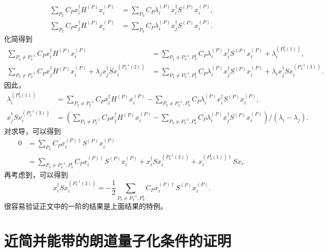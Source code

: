 \begin{align}
\sum_{P_{2}}C_{P}x_{i}^{\dagger}H^{(P)}x_{i}^{(P)} & =\sum_{P_{3}}C_{P}\lambda_{i}^{(P)}x_{i}^{\dagger}S^{(P)}x_{i}^{(P)},\\
\sum_{P_{2}}C_{P}x_{j}^{\dagger}H^{(P)}x_{i}^{(P)} & =\sum_{P_{3}}C_{P}\lambda_{i}^{(P)}x_{j}^{\dagger}S^{(P)}x_{i}^{(P)}.
\end{align}
化简得到
\begin{align}
\sum_{P_{2}\ne P_{2}^{-1}}C_{P}x_{i}^{\dagger}H^{(P)}x_{i}^{(P)} & =\sum_{P_{3}\ne P_{3}^{-1},P_{3}^{1}}C_{P}\lambda_{i}^{(P)}x_{i}^{\dagger}S^{(P)}x_{i}^{(P)}+\lambda_{i}^{(P_{3}^{1}(1))},\\
\sum_{P_{2}\ne P_{2}^{-1}}C_{P}x_{j}^{\dagger}H^{(P)}x_{i}^{(P)}+\lambda_{j}x_{j}^{\dagger}Sx_{i}^{(P_{2}^{-1}(2))} & =\sum_{P_{3}\ne P_{3}^{-1},P_{3}^{1}}C_{P}\lambda_{i}^{(P)}x_{j}^{\dagger}S^{(P)}x_{i}^{(P)}+\lambda_{i}x_{j}^{\dagger}Sx_{i}^{(P_{3}^{-1}(3))}.
\end{align}
因此，
\begin{align}
\lambda_{i}^{(P_{3}^{1}(1))} & =\sum_{P_{2}\ne P_{2}^{-1}}C_{P}x_{i}^{\dagger}H^{(P)}x_{i}^{(P)}-\sum_{P_{3}\ne P_{3}^{-1},P_{3}^{1}}C_{P}\lambda_{i}^{(P)}x_{i}^{\dagger}S^{(P)}x_{i}^{(P)},\\
x_{j}^{\dagger}Sx_{i}^{(P_{3}^{-1}(3))} & =(\sum_{P_{2}\ne P_{2}^{-1}}C_{P}x_{j}^{\dagger}H^{(P)}x_{i}^{(P)}-\sum_{P_{3}\ne P_{3}^{-1},P_{3}^{1}}C_{P}\lambda_{i}^{(P)}x_{j}^{\dagger}S^{(P)}x_{i}^{(P)})/(\lambda_{i}-\lambda_{j}).
\end{align}
对求导，可以得到 
\begin{equation}
\begin{split}
0  &=\sum_{P_{3}}C_{P}x_{i}^{(P)\dagger}S^{(P)}x_{i}^{(P)}\\
    &=\sum_{P_{3}\ne P_{3}^{-1},P_{3}^{1}}C_{P}x_{i}^{(P)\dagger}S^{(P)}x_{i}^{(P)}+x_{i}^{\dagger}Sx_{i}^{(P_{3}^{-1}(3))}+x_{i}^{(P_{3}^{1}(1))\dagger}Sx_{i}.
\end{split}
\end{equation}
再考虑到，可以得到 
\begin{equation}
x_{i}^{\dagger}Sx_{i}^{(P_{3}^{-1}(3))}=-\frac{1}{2}\sum_{P_{3}\ne P_{3}^{-1},P_{3}^{1}}C_{P}x_{i}^{(P)\dagger}S^{(P)}x_{i}^{(P)}.
\end{equation}
很容易验证正文中的一阶的结果是上面结果的特例。

\chapter{近简并能带的朗道量子化条件的证明}\label{app:quantizationruleproof}

